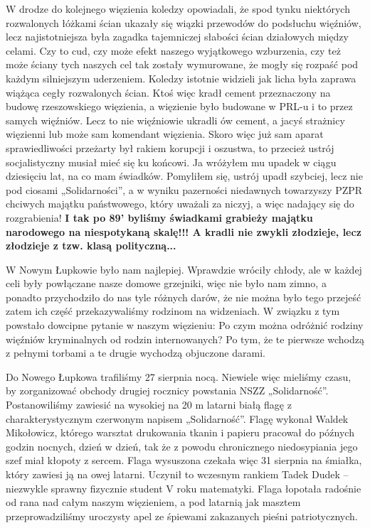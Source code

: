 W drodze do kolejnego więzienia koledzy opowiadali, że spod tynku niektórych rozwalonych łóżkami ścian ukazały się wiązki przewodów do podsłuchu więźniów, lecz najistotniejsza była zagadka tajemniczej słabości ścian działowych między celami. Czy to cud, czy może efekt naszego wyjątkowego wzburzenia, czy też może ściany tych naszych cel tak zostały wymurowane, że mogły się rozpaść pod każdym silniejszym uderzeniem. Koledzy istotnie widzieli jak licha była zaprawa wiążąca cegły rozwalonych ścian. Ktoś więc kradł cement przeznaczony na budowę rzeszowskiego więzienia, a więzienie było budowane w PRL-u i to przez samych więźniów. Lecz to nie więźniowie ukradli ów cement, a jacyś strażnicy więzienni lub może sam komendant więzienia. Skoro więc już sam aparat sprawiedliwości przeżarty był rakiem korupcji i oszustwa, to przecież ustrój socjalistyczny musiał mieć się ku końcowi. Ja wróżyłem mu upadek w ciągu dziesięciu lat, na co mam świadków. Pomyliłem się, ustrój upadł szybciej, lecz nie pod ciosami „Solidarności”, a w wyniku pazerności niedawnych towarzyszy PZPR chciwych majątku państwowego, który uważali za niczyj, a więc nadający się do rozgrabienia! \textbf{I tak po 89’ byliśmy świadkami grabieży majątku narodowego na niespotykaną skalę!!! A kradli nie zwykli złodzieje, lecz złodzieje z tzw. klasą polityczną...}

W Nowym Łupkowie było nam najlepiej. Wprawdzie wróciły chłody, ale w każdej celi były powłączane nasze domowe grzejniki, więc nie było nam zimno, a ponadto przychodziło do nas tyle różnych darów, że nie można było tego przejeść zatem ich część przekazywaliśmy rodzinom na widzeniach. W związku z tym powstało dowcipne pytanie w naszym więzieniu: Po czym można odróżnić rodziny więźniów kryminalnych od rodzin internowanych? Po tym, że te pierwsze wchodzą z pełnymi torbami a te drugie wychodzą objuczone darami.

Do Nowego Łupkowa trafiliśmy 27 sierpnia nocą. Niewiele więc mieliśmy czasu, by zorganizować obchody drugiej rocznicy powstania NSZZ „Solidarność”. Postanowiliśmy zawiesić na wysokiej na 20 m latarni białą flagę z charakterystycznym czerwonym napisem „Solidarność”. Flagę wykonał Waldek Mikołowicz, którego warsztat drukowania tkanin i papieru pracował do późnych godzin nocnych, dzień w dzień, tak że z powodu chronicznego niedosypiania jego szef miał kłopoty z sercem. Flaga wysuszona czekała więc 31 sierpnia na śmiałka, który zawiesi ją na owej latarni. Uczynił to wczesnym rankiem Tadek Dudek – niezwykle sprawny fizycznie student V roku matematyki. Flaga łopotała radośnie od rana nad całym naszym więzieniem, a pod latarnią jak masztem przeprowadziliśmy uroczysty apel ze śpiewami zakazanych pieśni patriotycznych. 

